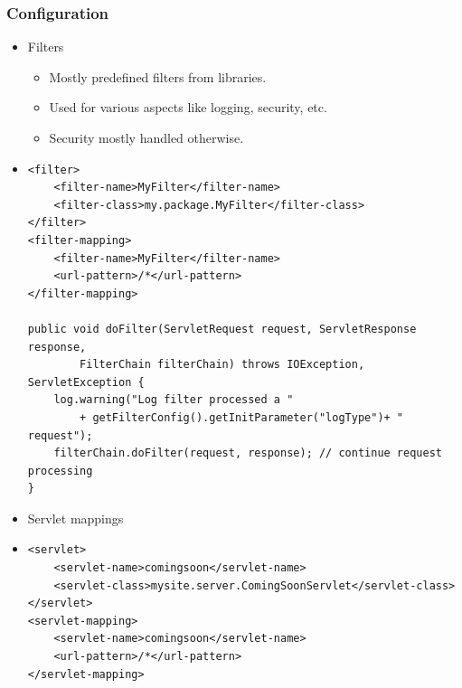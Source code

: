 \documentclass[10pt,xcolor=pdflatex]{beamer}
\begin{document}
\begin{frame}[containsverbatim]\frametitle{Configuration} 
	\begin{itemize}
    	\item Filters
          \begin{itemize}
        	\item Mostly predefined filters from libraries.
            \item Used for various aspects like logging, security, etc.
            \item Security mostly handled otherwise.
          \end{itemize}
        
        \item[] \begin{scriptsize}\begin{verbatim} 
<filter>
    <filter-name>MyFilter</filter-name>
    <filter-class>my.package.MyFilter</filter-class>
</filter>
<filter-mapping>
    <filter-name>MyFilter</filter-name>
    <url-pattern>/*</url-pattern>
</filter-mapping>

public void doFilter(ServletRequest request, ServletResponse response,
        FilterChain filterChain) throws IOException, ServletException {
    log.warning("Log filter processed a " 
        + getFilterConfig().getInitParameter("logType")+ " request");
    filterChain.doFilter(request, response); // continue request processing
}
\end{verbatim}
 \end{scriptsize}
		\item Servlet mappings
        \item[] \begin{scriptsize} \begin{verbatim} 
<servlet>
    <servlet-name>comingsoon</servlet-name>
    <servlet-class>mysite.server.ComingSoonServlet</servlet-class>
</servlet>
<servlet-mapping>
    <servlet-name>comingsoon</servlet-name>
    <url-pattern>/*</url-pattern>
</servlet-mapping>
\end{verbatim} \end{scriptsize}
    \end{itemize}
\end{frame}
\end{document}
